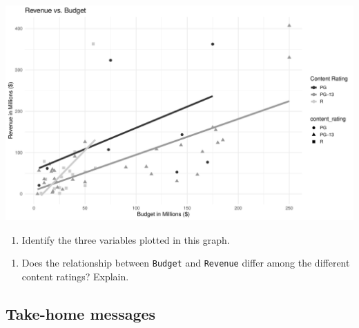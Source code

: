 \documentclass[
]{report}
\providecommand{\tightlist}{%
  \setlength{\itemsep}{0pt}\setlength{\parskip}{0pt}}
\begin{document}
\begin{center}\includegraphics[width=0.7\linewidth]{05-EDA-multivariate_files/figure-latex/unnamed-chunk-5-1} \end{center}

\begin{enumerate}
\def\labelenumi{\arabic{enumi}.}
\setcounter{enumi}{3}
\tightlist
\item
  Identify the three variables plotted in this graph.
\end{enumerate}

\vspace{0.5in}

\begin{enumerate}
\def\labelenumi{\arabic{enumi}.}
\setcounter{enumi}{4}
\tightlist
\item
  Does the relationship between \texttt{Budget} and \texttt{Revenue} differ among the different content ratings? Explain.
\end{enumerate}

\vspace{1in}

\hypertarget{take-home-messages-4}{%
\subsection{Take-home messages}\label{take-home-messages-4}}
\end{document}
